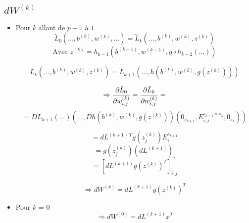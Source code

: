 \subsection{$dW^{(k)}$}
	\begin{itemize}
		\item Pour $k$ allant de $p-1$ à $1$\\
		\[\tilde{L}_0\left(...,b^{(k)}, w^{(k)}, ...\right) = \tilde{L}_{k}\left(...,b^{(k)}, w^{(k)}, z^{(k)}\right)\]
		\[\text{Avec } z^{(k)} = h_{k-1}\left(b^{(k-1)}, w^{(k-1)}, g\circ h_{k-2}\left(...\right)\right)\]
		\[\]
		
		\[\tilde{L}_{k}(..., b^{(k)}, w^{(k)}, z^{(k)}) = \tilde{L}_{k+1}\left(..., h\left(b^{(k)}, w^{(k)}, g\left(z^{(k)}\right)\right)\right)\]
			
		\[\Rightarrow \pdv{\tilde{L}_0}{w_{i,j}^{(k)}}(...) = \pdv{\tilde{L}_k}{w_{i,j}^{(k)}}(...) =\] 
		\[= D\tilde{L}_{k+1}\left(
															...%
												\right)\left(
																		 ..., Dh\left(
																									b^{(k)}, w^{(k)}, g\left(z^{(k)}\right)
																						\right)
																						\left(
																									0_{s_{k+1}}, E_{i, j}^{s_{k+1}\times s_k}, 0_{s_k}
																						\right)
															 \right)\]
																									
		\[= dL^{(k+1)~T} g\left(z^{(k)}_j\right)E_i^{s_{k + 1}}\]
		\[= g\left(z^{(k)}_j\right) \left(dL^{(k+1)}\right)_i\]
		\[= \left[dL^{(k+1)} g\left(z^{(k)}\right)^T\right]_{i,j}\]
		
		\[\Rightarrow \boxed{dW^{(k)} = dL^{(k+1)}g\left(z^{(k)}\right)^T}\]
		
		\item Pour $k$ = 0\\
			\[\Rightarrow \boxed{dW^{(0)} = dL^{(k+1)}x^T}\]
	\end{itemize}